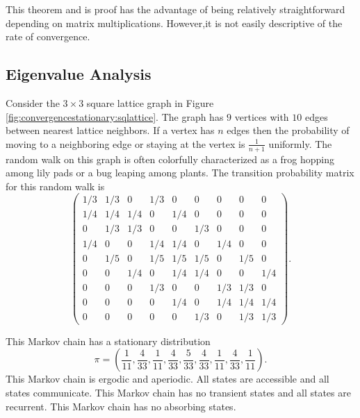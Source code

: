 \documentclass[12pt]{article}
\begin{document}
This theorem and is proof has the advantage of being relatively
straightforward depending on matrix multiplications.  However,it is not
easily descriptive of the rate of convergence.

\subsection*{Eigenvalue Analysis}

Consider the \( 3 \times 3 \) square lattice graph in Figure~%
\ref{fig:convergencestationary:sqlattice}.  The graph has \( 9 \)
vertices with \( 10 \) edges between nearest lattice neighbors.  If a
vertex has \( n \) edges then the probability of moving to a neighboring
edge or staying at the vertex is \( \frac{1}{n+1} \) uniformly.  The
random walk on this graph is often colorfully characterized as a frog
hopping among lily pads or a bug leaping among plants.  The transition
probability matrix for this random walk is
\[
    \begin{pmatrix}
        1/3 & 1/3 & 0 & 1/3 & 0 & 0 & 0 & 0 & 0 \\
        1/4 & 1/4 & 1/4 & 0 & 1/4 & 0 & 0 & 0 & 0 \\
        0 & 1/3 & 1/3 & 0 & 0 & 1/3 & 0 & 0 & 0 \\
        1/4 & 0 & 0 & 1/4 & 1/4 & 0 & 1/4 & 0 & 0 \\
        0 & 1/5 & 0 & 1/5 & 1/5 & 1/5 & 0 & 1/5 & 0 \\
        0 & 0 & 1/4 & 0 & 1/4 & 1/4 & 0 & 0 & 1/4 \\
        0 & 0 & 0 & 1/3 & 0 & 0 & 1/3 & 1/3 & 0 \\
        0 & 0 & 0 & 0 & 1/4 & 0 & 1/4 & 1/4 & 1/4 \\
        0 & 0 & 0 & 0 & 0 & 1/3 & 0 & 1/3 & 1/3
    \end{pmatrix}
    .
\]

This Markov chain has a stationary distribution
\[
    \pi = (\frac{1}{11}, \frac{4}{33}, \frac{1}{11}, \frac{4}{33}, \frac
    {5}{33}, \frac{4}{33}, \frac{1}{11}, \frac{4}{33}, \frac{1}{11}).
\] This Markov chain is ergodic and aperiodic.  All states are
accessible and all states communicate.  This Markov chain has no
transient states and all states are recurrent.  This Markov chain has no
absorbing states.
\end{document}
